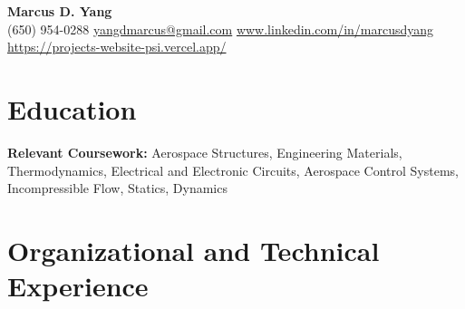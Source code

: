 \newcommand{\entrygap}{\vspace{2pt}}



\begin{center}
  {\fontsize{17}{20}\selectfont\bfseries Marcus D. Yang}\\[2pt]
  {\footnotesize (650) 954-0288 \textbar{} \href{mailto:yangdmarcus@gmail.com}{yangdmarcus@gmail.com} \textbar{} \href{https://www.linkedin.com/in/marcusdyang}{www.linkedin.com/in/marcusdyang} \textbar{} \href{https://projects-website-psi.vercel.app/}{https://projects-website-psi.vercel.app/}}
\end{center}

\section{Education}
\textbf{Relevant Coursework:} Aerospace Structures, Engineering Materials, Thermodynamics, Electrical and Electronic Circuits, Aerospace Control Systems, Incompressible Flow, Statics, Dynamics

\section{Organizational and Technical Experience}

